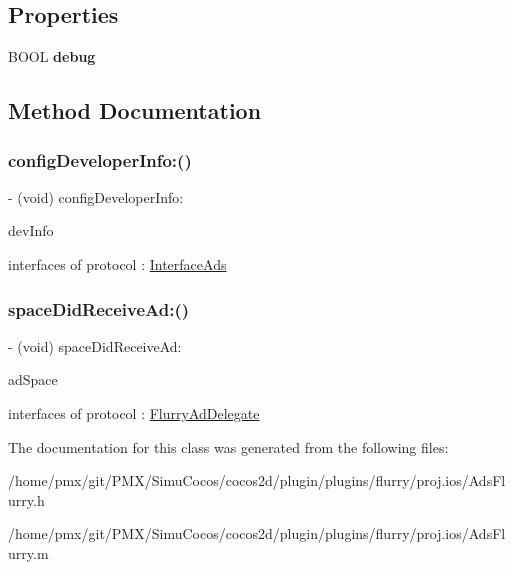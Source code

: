 \subsection*{Properties}
\begin{DoxyCompactItemize}
\item 
\mbox{\label{interfaceAdsFlurry_ad50ac36b86b31ea6a0a0288e5c015746}} 
B\+O\+OL {\bfseries debug}
\end{DoxyCompactItemize}


\subsection{Method Documentation}
\mbox{\label{interfaceAdsFlurry_a209033cc0195f245f70255b0f29457aa}} 
\subsubsection{\texorpdfstring{config\+Developer\+Info\+:()}{configDeveloperInfo:()}}
{\footnotesize\ttfamily -\/ (void) config\+Developer\+Info\+: \begin{DoxyParamCaption}\item[{(N\+S\+Mutable\+Dictionary$\ast$)}]{dev\+Info }\end{DoxyParamCaption}}

interfaces of protocol \+: \hyperlink{classInterfaceAds-p}{Interface\+Ads} \mbox{\label{interfaceAdsFlurry_aec9e59cf1944dfcc9df3dad439730b54}} 
\subsubsection{\texorpdfstring{space\+Did\+Receive\+Ad\+:()}{spaceDidReceiveAd:()}}
{\footnotesize\ttfamily -\/ (void) space\+Did\+Receive\+Ad\+: \begin{DoxyParamCaption}\item[{(N\+S\+String$\ast$)}]{ad\+Space }\end{DoxyParamCaption}}

interfaces of protocol \+: \hyperlink{classFlurryAdDelegate-p}{Flurry\+Ad\+Delegate} 

The documentation for this class was generated from the following files\+:\begin{DoxyCompactItemize}
\item 
/home/pmx/git/\+P\+M\+X/\+Simu\+Cocos/cocos2d/plugin/plugins/flurry/proj.\+ios/Ads\+Flurry.\+h\item 
/home/pmx/git/\+P\+M\+X/\+Simu\+Cocos/cocos2d/plugin/plugins/flurry/proj.\+ios/Ads\+Flurry.\+m\end{DoxyCompactItemize}
